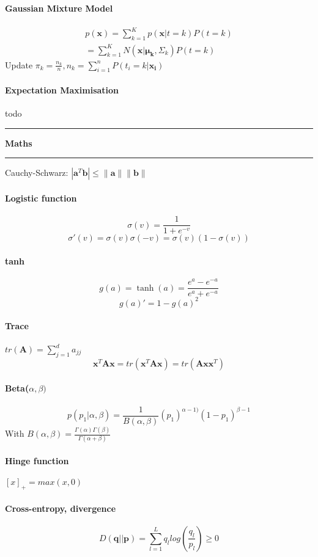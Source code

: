\documentclass[7pt]{scrartcl}
\newlength{\secskip}
\renewcommand{\section}[1]{
  \vspace{\secskip}
  \hrule\vspace{.4em}
  \textbf{#1}
  \vspace{.4em}
  \hrule
  \vspace{\secskip}
}
\renewcommand{\vec}{\mathbf}
\begin{document}
\begin{multicols}{4}
\paragraph{Gaussian Mixture Model}
\begin{align*}
p(\vec{x}) = \sum_{k=1}^K p(\vec{x}|t=k) P(t=k) \\
=  \sum_{k=1}^K N(\vec{x}|\vec{\mu_k},\Sigma_k)P(t=k)
\end{align*}
Update $\pi_k = \frac{n_k}{n}, n_k = \sum_{i=1}^nP(t_i=k|\vec{x_i})$

\paragraph{Expectation Maximisation}
todo

\section{Maths} 
Cauchy-Schwarz: $|\vec a ^T \vec b|\leq \| \vec a \| \| \vec b \|$
\paragraph{Logistic function}
$$\sigma(v) = \frac{1}{1+e^{-v}}$$
$$\sigma'(v) = \sigma(v)\sigma(-v) = \sigma(v)(1-\sigma(v))$$
\paragraph{tanh}
$$g(a)=\tanh(a)=\frac{e^a-e^{-a}}{e^a + e^{-a}}$$
$$g(a)'=1 - g(a)^2$$
\paragraph{Trace}
$tr(\vec{A}) = \sum_{j=1}^{d}a_{jj}$
\[\vec{x}^T \vec{A} \vec{x} = tr(\vec{x}^T \vec{A} \vec{x}) = tr(\vec{A} \vec{xx}^T)\]
\paragraph{Beta($\alpha,\beta)$}
\[p(p_1|\alpha,\beta) = \frac{1}{B(\alpha,\beta)}(p_1)^{\alpha -1)}(1-p_1)^{\beta -1}\]
With $B(\alpha,\beta) = \frac{\Gamma(\alpha)\Gamma(\beta)}{\Gamma(\alpha + \beta)}$
\paragraph{Hinge function}
$[x]_+ = max(x,0)$
\paragraph{Cross-entropy, divergence}
\[D(\vec{q}||\vec{p}) = \sum_{l=1}^L q_l log(\frac{q_l}{p_l}) \geq 0\]
\end{multicols}
\end{document}
